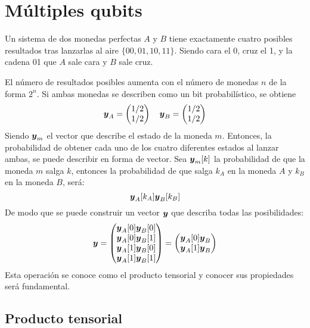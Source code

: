 \section{Múltiples qubits}
Un sistema de dos monedas perfectas $A$ y $B$ tiene exactamente cuatro posibles 
resultados tras lanzarlas al aire $\{00, 01, 10, 11\}$. Siendo cara el 0, cruz 
el 1, y la cadena 01 que $A$ sale cara y $B$ sale cruz.

El número de resultados posibles aumenta con el número de monedas $n$ de la 
forma $2^n$. Si ambas monedas se describen como un bit probabilístico, se 
obtiene
$$ \boldsymbol{y}_A = \begin{pmatrix} 1/2 \\ 1/2 \end{pmatrix} \quad \boldsymbol{y}_B = \begin{pmatrix} 1/2 \\ 1/2 \end{pmatrix} $$
Siendo $\boldsymbol{y}_m$ el vector que describe el estado de la moneda $m$.  Entonces, la 
probabilidad de obtener cada uno de los cuatro diferentes estados al lanzar 
ambas, se puede describir en forma de vector.
Sea $\boldsymbol{y}_m[k]$ la probabilidad de que la moneda $m$ salga $k$, entonces la 
probabilidad de que salga $k_A$ en la moneda $A$ y $k_B$ en la moneda $B$, será:
$$ \boldsymbol{y}_A[k_A]  \boldsymbol{y}_B[k_B] $$
De modo que se puede construir un vector $\boldsymbol{y}$ que describa todas las 
posibilidades:
$$ \boldsymbol{y} = \begin{pmatrix} 
	\boldsymbol{y}_A[0]  \boldsymbol{y}_B[0] \\ \boldsymbol{y}_A[0]  \boldsymbol{y}_B[1] \\
	\boldsymbol{y}_A[1]  \boldsymbol{y}_B[0] \\ \boldsymbol{y}_A[1]  \boldsymbol{y}_B[1]
 \end{pmatrix}
= \begin{pmatrix} 
	\boldsymbol{y}_A[0]  \boldsymbol{y}_B \\
	\boldsymbol{y}_A[1]  \boldsymbol{y}_B
 \end{pmatrix} $$
Esta operación se conoce como el producto tensorial y conocer sus propiedades
será fundamental.

\subsection{Producto tensorial}
\label{sss:producto-tensorial}

